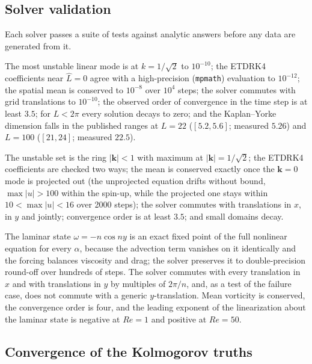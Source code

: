 \subsection{Solver validation}
\label{app:solver_tests}

Each solver passes a suite of tests against analytic answers before any
data are generated from it.

 The most unstable linear mode is at $k=1/\sqrt2$ to
$10^{-10}$; the ETDRK4 coefficients near $\hat L=0$ agree with a
high-precision (\texttt{mpmath}) evaluation to $10^{-12}$; the spatial mean
is conserved to $10^{-8}$ over $10^4$ steps; the solver commutes with
grid translations to $10^{-10}$; the observed order of convergence in the
time step is at least $3.5$; for $L<2\pi$ every solution decays to zero;
and the Kaplan--Yorke dimension falls in the published ranges at $L=22$
($[5.2,5.6]$; measured $5.26$) and $L=100$ ($[21,24]$; measured $22.5$).

 The unstable set is the ring $|\bm k|<1$ with maximum at
$|\bm k|=1/\sqrt2$; the ETDRK4 coefficients are checked two ways; the
mean is conserved exactly once the $\bm k=0$ mode is projected out (the
unprojected equation drifts without bound, $\max|u|>100$ within the
spin-up, while the projected one stays within $10<\max|u|<16$ over 2000
steps); the solver commutes with translations in $x$, in $y$ and jointly;
convergence order is at least $3.5$; and small domains decay.

 The laminar state $\omega=-n\cos ny$ is an exact
fixed point of the full nonlinear equation for every $\alpha$, because
the advection term vanishes on it identically and the forcing balances
viscosity and drag; the solver preserves it to double-precision round-off
over hundreds of steps. The solver commutes with every translation in $x$
and with translations in $y$ by multiples of $2\pi/n$, and, as a test of
the failure case, does not commute with a generic $y$-translation. Mean
vorticity is conserved, the convergence order is four, and the leading
exponent of the linearization about the laminar state is negative at
$Re=1$ and positive at $Re=50$.

\subsection{Convergence of the Kolmogorov truths}
\label{app:truth_convergence}

